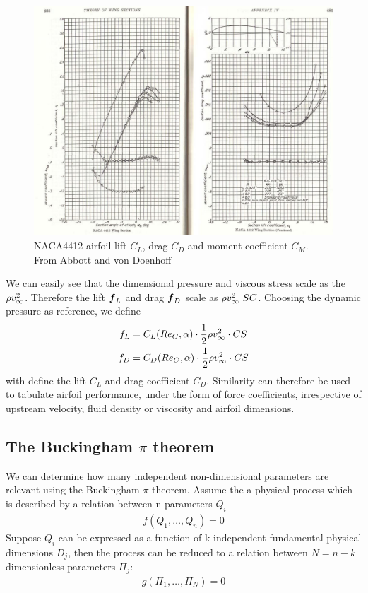 %
\begin{figure}[!h]
  \centering
  \includegraphics[width=\textwidth]{principles/naca4412_1.png}
  \caption{NACA4412 airfoil lift $C_L$, drag $C_D$ and moment
    coefficient $C_M$. From Abbott and von Doenhoff
    \cite{AbbottDoenhoff}}
  \label{fig:naca4412}
\end{figure}
%
We can easily see that the dimensional pressure and viscous stress
scale as the $\rho v_\infty^2 $. Therefore the lift $\boldsymbol {f}_L$ and
drag $\boldsymbol {f}_D$ scale as $\rho v_\infty^2~SC$. Choosing the
dynamic pressure as reference, we define
\begin{align*}
  f_L &= C_L(Re_C,\alpha) \cdot \frac{1}{2} \rho v_\infty^2 \cdot C S \\
  f_D &= C_D(Re_C,\alpha) \cdot \frac{1}{2} \rho v_\infty^2 \cdot C S
\end{align*}
with define the lift $C_L$ and drag coefficient $C_D$. Similarity can
therefore be used to tabulate airfoil performance, under the form of
force coefficients, irrespective of upstream velocity, fluid density
or viscosity and airfoil dimensions.

\subsection{The Buckingham $\pi$ theorem}

We can determine how many independent non-dimensional parameters are
relevant using the Buckingham $\pi$ theorem. Assume the a physical
process which is described by a relation between n parameters $Q_i$
\begin{align*}
  f(Q_1,\ldots,Q_n)=0
\end{align*}
Suppose $Q_i$ can be expressed as a function of k independent
fundamental physical dimensions $D_j$, then the process can be reduced
to a relation between $N=n-k$ dimensionless parameters $\Pi_j$:
\begin{align*}
  g(\Pi_1,\ldots,\Pi_N) = 0
\end{align*}

